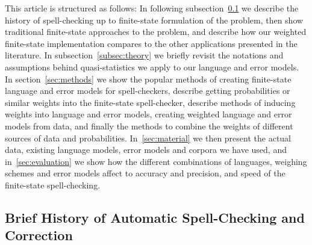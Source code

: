 \documentclass[a4paper,12pt]{article}
\begin{document}
This article is structured as follows: In following
subsection~\ref{subsec:background} we describe the history of spell-checking up
to finite-state formulation of the problem, then show traditional finite-state
approaches to the problem, and describe how our weighted finite-state
implementation compares to the other applications presented in the literature.
In subsection~\ref{subsec:theory} we briefly revisit the notations and
assumptions behind quasi-statistics we apply to our language and error models.
In section~\ref{sec:methods} we show the popular methods of creating
finite-state language and error models for spell-checkers, describe getting
probabilities or similar weights into the finite-state spell-checker, describe
methods of inducing weights into language and error models, creating weighted
language and error models from data, and finally the methods to combine the
weights of different sources of data and probabilities. In~\ref{sec:material} we
then present the actual data, existing language models, error models and
corpora we have used, and in~\ref{sec:evaluation} we show how the different
combinations of languages, weighing schemes and error models affect to accuracy
and precision, and speed of the finite-state spell-checking.

\subsection{Brief History of Automatic Spell-Checking and Correction}
\label{subsec:background}
\end{document}
